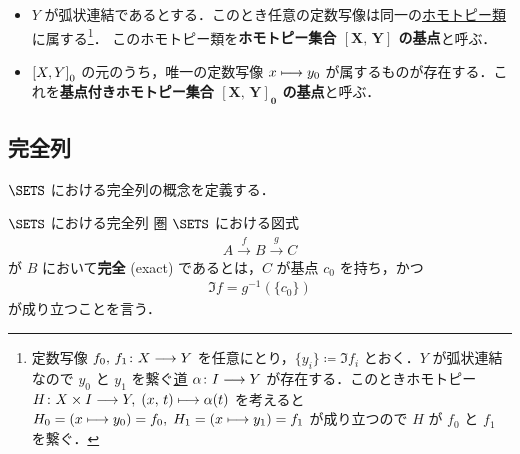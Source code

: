 \documentclass[algtopo_main]{subfiles}
\begin{document}
\begin{itemize}
    \item $Y$ が弧状連結であるとする．このとき任意の定数写像は同一の\hyperref[def:homotopy-basic]{ホモトピー類}に属する\footnote{定数写像 $f_0,\, f_1 \colon X \longrightarrow Y$ を任意にとり，$\{y_i\} \coloneqq \Im f_i$ とおく．$Y$ が弧状連結なので $y_0$ と $y_1$ を繋ぐ\hyperref[def:path-basic]{道} $\alpha \colon I \longrightarrow Y$ が存在する．このときホモトピー $H \colon X \times I \longrightarrow Y,\; (x,\, t) \longmapsto \alpha(t)$ を考えると $H_0 = (x \longmapsto y_0) = f_0,\; H_1 = (x \longmapsto y_1) = f_1$ が成り立つので $H$ が $f_0$ と $f_1$ を繋ぐ．}．
    このホモトピー類を\textbf{ホモトピー集合 $\bm{[X,\, Y]}$ の基点}と呼ぶ．
    \item $\comm{X}{Y}_0$ の元のうち，唯一の定数写像 $x \longmapsto y_0$ が属するものが存在する．これを\textbf{基点付きホモトピー集合 $\bm{[X,\, Y]_0}$ の基点}と呼ぶ．
\end{itemize}

\subsection{完全列}

$\SETS$ における完全列の概念を定義する．
\begin{mydef}[label=def:ES-SETS]{$\SETS$ における完全列}
    圏 $\SETS$ における図式
    \begin{align}
        A \xrightarrow{f} B \xrightarrow{g} C
    \end{align}
    が $B$ において\textbf{完全} (exact) であるとは，$C$ が基点 $c_0$ を持ち，かつ
    \begin{align}
        \Im f = g^{-1}(\{c_0\})
    \end{align}
    が成り立つことを言う．
\end{mydef}
\end{document}
